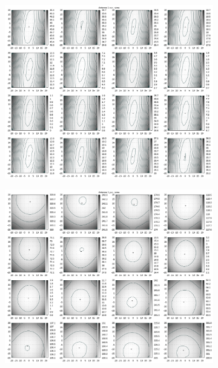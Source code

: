 \begin{appendix}
\begin{figure}[!ht]
\begin{subfigure}[t]{0.3\textwidth}
	\end{subfigure}
	\begin{subfigure}[t]{0.3\textwidth}
		\centering
	     \includegraphics[width=\textwidth]{img/fitness/xz/a1.png}
	\end{subfigure}
	\begin{subfigure}[t]{0.3\textwidth}
			\centering
	   \includegraphics[width=\textwidth]{img/fitness/yz/a1.png}

\end{subfigure}
\end{figure}
\end{appendix}
